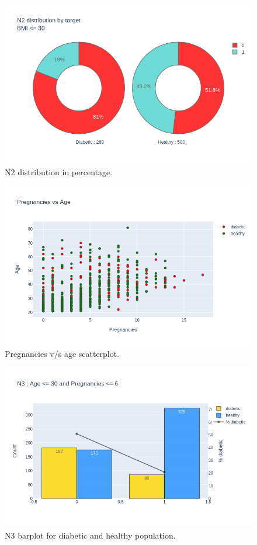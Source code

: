 \documentclass[12pt]{article}
\begin{document}
\begin{figure}[ht]
\centering
\includegraphics[width=1\textwidth]{newplot(16).png}
\caption{\label{fig:26} N2 distribution in percentage.}
\end{figure}

\begin{figure}[ht]
\centering
\includegraphics[width=1\textwidth]{newplot(17).png}
\caption{\label{fig:27} Pregnancies v/s age scatterplot.}
\end{figure}

\begin{figure}[ht]
\centering
\includegraphics[width=1\textwidth]{newplot(18).png}
\caption{\label{fig:28} N3 barplot for diabetic and healthy population.}
\end{figure}
\end{document}
